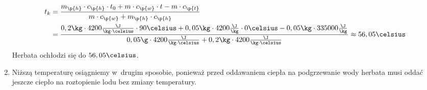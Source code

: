 \begin{enumerate}[label={\alph*)}]
\begin{align*}
\begin{split}
                t_k &= \frac{m_\p{h} \cdot c_\p{h} \cdot t_0 + m \cdot c_\p{w} \cdot t - m \cdot c_\p{t}}{m \cdot c_\p{w} + m_\p{h} \cdot c_\p{h}}\\
                    &= \frac{0,2\kg \cdot 4200\frac{\J}{\kg \cdot \celsius} \cdot 90\celsius + 0,05\kg \cdot 4200\frac{\J}{\kg} \cdot 0\celsius - 0,05\kg \cdot 335000\frac{\J}{\kg}}{0,05\g \cdot 4200\frac{\J}{\kg \cdot \celsius} + 0,2\kg \cdot 4200\frac{\J}{\kg \cdot \celsius}} \approx 56,05\celsius
            \end{split}
        \end{align*}
        Herbata ochłodzi się do \(56,05\celsius\).
    \item Niższą temperaturę osiągniemy w~drugim sposobie, ponieważ przed oddawaniem ciepła na podgrzewanie wody herbata musi oddać jeszcze ciepło na roztopienie lodu bez zmiany temperatury.
\end{enumerate}

